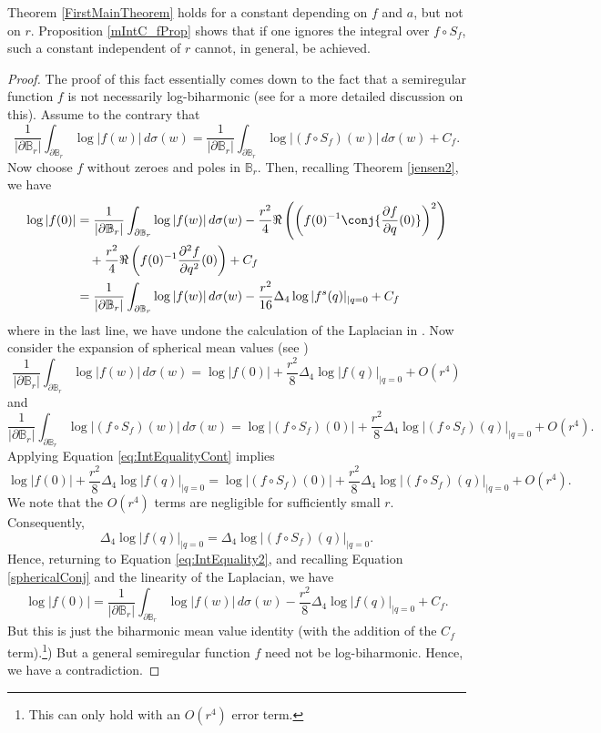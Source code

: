 \documentclass{amsart}
\begin{document}
   \begin{remark}
    Theorem \ref{FirstMainTheorem} holds for a constant depending on $f$ and $a$, but not on $r$. Proposition \ref{mIntC_fProp} shows that if one ignores the integral over $f\circ S_f$, such a constant independent of $r$ cannot, in general, be achieved.
    \end{remark}
       
    \begin{proof}
    The proof of this fact essentially comes down to the fact that a semiregular function $f$ is not necessarily log-biharmonic (see \cite[Remark 2.8]{Altavilla_2019} for a more detailed discussion on this). Assume to the contrary that \begin{equation}\label{eq:IntEqualityCont}\frac{1}{|\partial \mathbb B_r|}\int_{\partial \mathbb B_r}\log|f(w)|\,d\sigma(w)= \frac{1}{|\partial \mathbb B_r|}\int_{\partial \mathbb B_r}\log |(f\circ S_f)(w)|\,d\sigma(w)+C_f.\end{equation}
    Now choose $f$ without zeroes and poles in $\mathbb B_r$. Then, recalling Theorem \ref{jensen2}, we have \begin{align}\label{eq:IntEquality2}
        \log|f(0)|&=\frac1{|\partial \mathbb B_r|}\int_{\partial \mathbb B_r}\log|f(w)|\,d\sigma(w) -\frac{r^2}{4}\Re \left(\left(f(0)^{-1}\conj{\frac{\partial f}{\partial q}(0)}\right)^2\right)\nonumber\\
        &\quad +\frac {r^2}4\Re\left(f(0)^{-1}\frac{\partial^2f}{\partial q^2}(0)\right) + C_f \nonumber\\
        &= \frac1{|\partial \mathbb B_r|}\int_{\partial \mathbb B_r}\log|f(w)|\,d\sigma(w)-\frac{r^2}{16}\Delta_4\log |f^s(q)|_{\mid q=0}+C_f
    \end{align}
    where in the last line, we have undone the calculation of the Laplacian in \cite[Proposition 8]{perottiJensen2019}. Now consider the expansion of spherical mean values (see \cite[Theorem 3]{Ovall2016}) \[\frac1{|\partial \mathbb B_r|}\int_{\partial \mathbb B_r}\log|f(w)|\,d\sigma(w)=\log|f(0)|+\frac{r^2}{8}\Delta_4\log|f(q)|_{\mid q=0}+O(r^4)\] and \[\frac1{|\partial \mathbb B_r|}\int_{\partial \mathbb B_r}\log|(f\circ S_f)(w)|\,d\sigma(w)=\log|(f\circ S_f)(0)|+\frac{r^2}{8}\Delta_4\log|(f\circ S_f)(q)|_{\mid q=0}+O(r^4).\] Applying Equation \ref{eq:IntEqualityCont} implies \[\log|f(0)|+\frac{r^2}{8}\Delta_4\log|f(q)|_{\mid q=0}=\log|(f\circ S_f)(0)|+\frac{r^2}{8}\Delta_4\log|(f\circ S_f)(q)|_{\mid q=0}+O(r^4).\] We note that the $O(r^4)$ terms are negligible for sufficiently small $r$. Consequently, \[\Delta_4\log|f(q)|_{\mid q=0}=\Delta_4\log|(f\circ S_f)(q)|_{\mid q=0}.\] Hence, returning to Equation \ref{eq:IntEquality2}, and recalling Equation \ref{sphericalConj} and the linearity of the Laplacian,  we have \[\log|f(0)|= \frac1{|\partial \mathbb B_r|}\int_{\partial \mathbb B_r}\log|f(w)|\,d\sigma(w)-\frac{r^2}{8}\Delta_4\log |f(q)|_{\mid q=0}+C_f.\] But this is just the biharmonic mean value identity (with the addition of the $C_f$ term).\footnote{This can only hold with an $O(r^4)$ error term.}) But a general semiregular function $f$ need not be log-biharmonic. Hence, we have a contradiction. 
    \end{proof}
\end{document}
